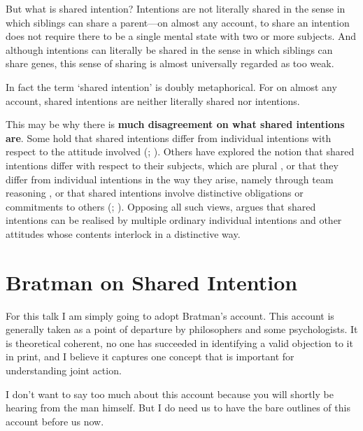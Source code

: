 \documentclass[12pt,a4paper]{extarticle}
\begin{document}
But what is shared intention?
Intentions are not literally shared in the sense in which siblings can share a parent---on almost any account, to share an intention does not require there to be a single mental state with two or more subjects.
And although intentions can literally be shared in the sense in which siblings can share genes, this sense of sharing is almost universally regarded as too weak.

In fact the term `shared intention' is doubly metaphorical.
For on almost any account, shared intentions are neither literally shared nor intentions.

This may be why there is \textbf{much disagreement on what shared intentions are}. 
Some hold that shared intentions differ from individual intentions with respect to the attitude involved (\citealp{Kutz:2000si}; \citealp{Searle:1990em}). 
Others have explored the notion that shared intentions differ with respect to their subjects, which are plural \citep{Gilbert:1992rs}, 
or that they differ from individual intentions in the way they arise, namely through team reasoning \citep{Gold:2007zd}, 
or that shared intentions involve distinctive obligations or commitments to others (\citealp{Gilbert:1992rs}; \citealp{Roth:2004ki}).
Opposing all such views, \citet{Bratman:1992mi,Bratman:2009lv} argues that shared intentions can be realised by multiple ordinary individual intentions and other attitudes whose contents interlock in a distinctive way. 


\section{Bratman on Shared Intention}
For this talk I am simply going to adopt  Bratman's account.
This account is generally taken as a point of departure by philosophers and some psychologists.
It is theoretical coherent, 
no one has succeeded in identifying a valid objection to it in print, 
and I believe it captures one concept that is important for understanding joint action.

I don't want to say too much about this account because you will shortly be hearing from the man himself.
But I do need us to have the bare outlines of this account before us now.
\end{document}
